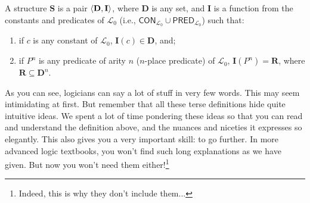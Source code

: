 \begin{defn}
A structure $\mathbf{S}$ is a pair $\langle\mathbf{D}, \mathbf{I}\rangle$, where $\mathbf{D}$ is any set, and $\mathbf{I}$ is a function from the constants and predicates of $\mathcal{L}_0$ (i.e., $\mathsf{CON}_{\mathcal{L}_0} \cup \mathsf{PRED}_{\mathcal{L}_0}$) such that:
%
\begin{enumerate}
	\item if $c$ is any constant of $\mathcal{L}_0$, $\mathbf{I}(c) \in \mathbf{D}$, and;
	\item if $P^n$ is any predicate  of arity $n$ ($n$-place predicate) of $\mathcal{L}_0$, $\mathbf{I}(P^n)=\mathbf{R}$, where $\mathbf{R} \subseteq \mathbf{D}^n$. 
\end{enumerate}
\end{defn}

As you can see, logicians can say a lot of stuff in very few words. This may seem intimidating at first. But remember that all these terse definitions hide quite intuitive ideas. We spent a lot of time pondering these ideas so that you can read and understand the definition above, and the nuances and niceties it expresses so elegantly. This also gives you a very important skill: to go further. In more advanced logic textbooks, you won't find such long explanations as we have given. But now you won't need them either!\footnote{Indeed, this is why they don't include them...}